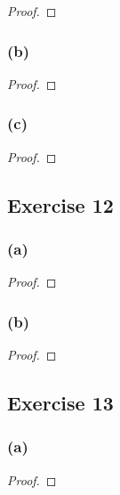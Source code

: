 \documentclass[14pt]{extarticle}
\begin{document}
\begin{proof}

\end{proof}

\subsubsection{(b)}

\begin{proof}

\end{proof}

\subsubsection{(c)}

\begin{proof}

\end{proof}

\subsection{Exercise 12}

\subsubsection{(a)}

\begin{proof}

\end{proof}

\subsubsection{(b)}

\begin{proof}

\end{proof}

\subsection{Exercise 13}

\subsubsection{(a)}

\begin{proof}

\end{proof}
\end{document}
